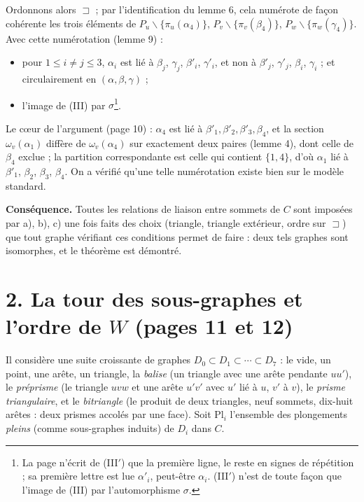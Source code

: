 \documentclass[11pt,a4paper]{article}
\begin{document}
Ordonnons alors $\sqsupset$ ; par l'identification du lemme 6, cela numérote de
façon cohérente les trois éléments de $P_u \smallsetminus \lbrace
\pi_u(\alpha_4)\rbrace$, $P_v \smallsetminus \lbrace \pi_v(\beta_4)\rbrace$,
$P_w \smallsetminus \lbrace\pi_w(\gamma_4)\rbrace$. Avec cette numérotation
(lemme 9) :

\begin{itemize}
\item[(III)] pour $1 \leq i \neq j \leq 3$, $\alpha_i$ est lié à $\beta_j$,
  $\gamma_j$, $\beta'_i$, $\gamma'_i$, et non à $\beta'_j$, $\gamma'_j$,
  $\beta_i$, $\gamma_i$ ; et circulairement en $(\alpha, \beta, \gamma)$ ;
\item[(III$'$)] l'image de (III) par $\sigma$\footnote{La page n'écrit de
  (III$'$) que la première ligne, le reste en signes de répétition ; sa
  première lettre est lue $\alpha'_i$, peut-être $\alpha_i$. (III$'$) n'est de
  toute façon que l'image de (III) par l'automorphisme $\sigma$.}.
\end{itemize}

Le cœur de l'argument (page 10) : $\alpha_4$ est lié à $\beta'_1, \beta'_2,
\beta'_3, \beta_4$, et la section $\omega_v(\alpha_1)$ diffère de
$\omega_v(\alpha_4)$ sur exactement deux paires (lemme 4), dont celle de
$\beta_4$ exclue ; la partition correspondante est celle qui contient
$\lbrace 1, 4\rbrace$, d'où $\alpha_1$ lié à $\beta'_1$, $\beta_2$, $\beta_3$,
$\beta_4$. On a vérifié qu'une telle numérotation existe bien sur le modèle
standard.

\textbf{Conséquence.} Toutes les relations de liaison entre sommets de $C$
sont imposées par a), b), c) une fois faits des choix (triangle, triangle
extérieur, ordre sur $\sqsupset$) que tout graphe vérifiant ces conditions
permet de faire : deux tels graphes sont isomorphes, et le théorème est
démontré.

\section*{2. La tour des sous-graphes et l'ordre de $W$ (pages 11 et 12)}

Il considère une suite croissante de graphes $D_0 \subset D_1 \subset \cdots
\subset D_7$ : le vide, un point, une arête, un triangle, la
\emph{balise} (un triangle avec une arête pendante $uu'$), le
\emph{préprisme} (le triangle $u v w$ et une arête $u'v'$ avec $u'$ lié à $u$,
$v'$ à $v$), le \emph{prisme triangulaire}, et le \emph{bitriangle} (le
produit de deux triangles, neuf sommets, dix-huit arêtes : deux prismes
accolés par une face). Soit $\mathrm{Pl}_i$ l'ensemble des plongements
\emph{pleins} (comme sous-graphes induits) de $D_i$ dans $C$.
\end{document}
